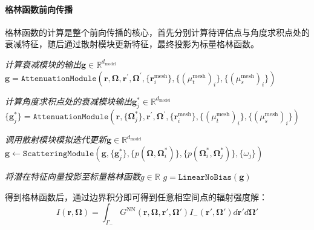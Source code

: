 \paragraph{格林函数前向传播} 格林函数的计算是整个前向传播的核心，首先分别计算待评估点与角度求积点处的衰减特征，随后通过散射模块更新特征，最终投影为标量格林函数。

\begin{algorithm}[htp!]
    \caption{格林函数}\label{alg:code-green-function}
    \SetAlgoLined

    \BlankLine

    \emph{计算衰减模块的输出$\bm{g}\in \mathbb{R}^{d_{\text{model}}}$}\;
    $\bm{g}=\texttt{AttenuationModule}(\boldsymbol{r},\boldsymbol{\Omega},\boldsymbol{r}^{\prime},\boldsymbol{\Omega}^{\prime},\{\boldsymbol{r}_i^{\text{mesh}}\},\{{(\mu_t^{\text{mesh}})}_i\},\{{(\mu_s^{\text{mesh}})}_i\})$\;

    \emph{计算角度求积点处的衰减模块输出$\bm{g}^*_j\in \mathbb{R}^{d_{\text{model}}}$}\;
    $\{\bm{g}^*_j\}=\texttt{AttenuationModule}(\boldsymbol{r},\{\boldsymbol{\Omega}_j^*\},\boldsymbol{r}^{\prime},\boldsymbol{\Omega}^{\prime},\{\boldsymbol{r}_i^{\mathrm{mesh}}\},\{{(\mu_t^{\mathrm{mesh}})}_i\}, \{{(\mu_s^{\mathrm{mesh}})}_i\})$\;

    \emph{调用散射模块模拟迭代更新$\bm{g}\in \mathbb{R}^{d_{\text{model}}}$}\;
    $\bm{g}\gets\texttt{ScatteringModule}(\bm{g}, \{\bm{g}^*_j\}, \{p(\boldsymbol{\Omega},\boldsymbol{\Omega}^*_i)\},\{p(\boldsymbol{\Omega}^*_i,\boldsymbol{\Omega}^*_j)\}, \{\omega_j\})$\;

    \emph{将潜在特征向量投影至标量格林函数$g\in\mathbb{R}$}\;
    $g = \texttt{LinearNoBias}(\bm{g})$\;

    \;
\end{algorithm}

得到格林函数后，通过边界积分即可得到任意相空间点的辐射强度解：
\begin{equation}
    I(\boldsymbol{r},\boldsymbol{\Omega}) = \int_{\Gamma_-} G^{\text{NN}}(\boldsymbol{r},\boldsymbol{\Omega},\boldsymbol{r}',\boldsymbol{\Omega}') I_-(\boldsymbol{r}',\boldsymbol{\Omega}') d\boldsymbol{r}' d\boldsymbol{\Omega}'
\end{equation}

